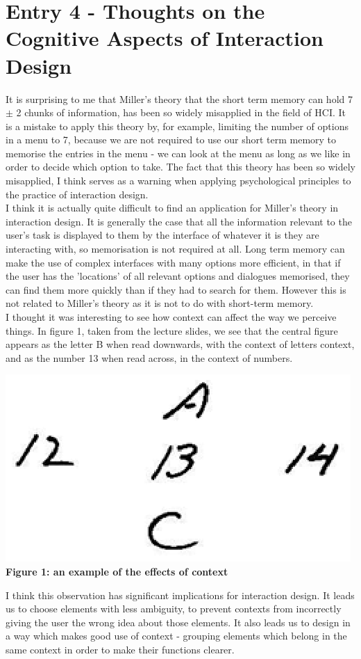 \documentclass{article}
\begin{document}
\section*{Entry 4 - Thoughts on the Cognitive Aspects of Interaction Design}

\noindent It is surprising to me that Miller's theory that the short term memory can hold 7 $\pm$ 2 chunks of information, has been so widely misapplied in the field of HCI. It is a mistake to apply this theory by, for example, limiting the number of options in a menu to 7, because we are not required to use our short term memory to memorise the entries in the menu - we can look at the menu as long as we like in order to decide which option to take. The fact that this theory has been so widely misapplied, I think serves as a warning when applying psychological principles to the practice of interaction design.
\\\indent I think it is actually quite difficult to find an application for Miller's theory in interaction design. It is generally the case that all the information relevant to the user's task is displayed to them by the interface of whatever it is they are interacting with, so memorisation is not required at all. Long term memory can make the use of complex interfaces with many options more efficient, in that if the user has the 'locations' of all relevant options and dialogues memorised, they can find them more quickly than if they had to search for them. However this is not related to Miller's theory as it is not to do with short-term memory.
\\\indent I thought it was interesting to see how context can affect the way we perceive things. In figure 1, taken from the lecture slides, we see that the central figure appears as the letter B when read downwards, with the context of letters context, and as the number 13 when read across, in the context of numbers.
\\\begin{center}\includegraphics{context}\\\textbf{Figure 1: an example of the effects of context}\end{center}
I think this observation has significant implications for interaction design. It leads us to choose elements with less ambiguity, to prevent contexts from incorrectly giving the user the wrong idea about those elements. It also leads us to design in a way which makes good use of context - grouping elements which belong in the same context in order to make their functions clearer.
\end{document}
